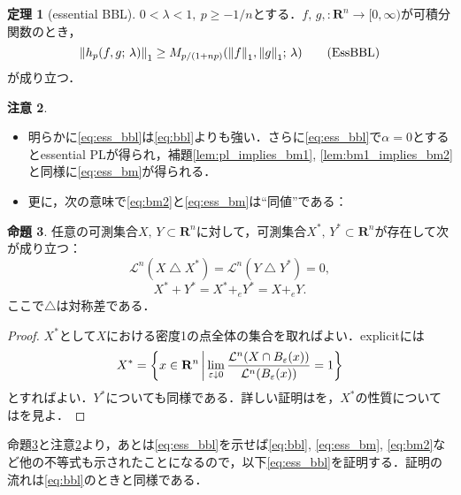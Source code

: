 \documentclass[a4j]{ltjsarticle}
\newcommand{\Rset}{\mathbf{R}}
\newcommand{\Lm}{\mathcal{L}}
\newcommand{\1}{\bm{1}}
\newcommand{\M}[4]{M_{#1}\qty(#2,#3;\,#4)}
\numberwithin{equation}{section}
\theoremstyle{definition}
\newtheorem{thm}{定理}[section]
\newtheorem{prop}[thm]{命題}
\newtheorem{rmk}[thm]{注意}
\begin{document}
\begin{thm}[essential BBL]\label{thm:ess_bbl}
    $0<\lambda<1,\ p\geq -1/n$とする．$f,\,g,\colon\Rset^n\to[0,\infty)$が可積分関数のとき，
    \begin{equation}
        \norm{h_{p}(f,g;\,\lambda)}_{1}\geq \M{p/(1+np)}{\norm{f}_{1}}{\norm{g}_{1}}{\lambda}\label{eq:ess_bbl}\tag{EssBBL}
    \end{equation}
    が成り立つ．
\end{thm}
\begin{rmk}\label{rmk:ess_ineqs}
    \begin{itemize}
        \item 明らかに\eqref{eq:ess_bbl}は\eqref{eq:bbl}よりも強い．さらに\eqref{eq:ess_bbl}で$\alpha=0$とするとessential PLが得られ，補題\ref{lem:pl_implies_bm1}, \ref{lem:bm1_implies_bm2}と同様に\eqref{eq:ess_bm}が得られる．
        \item 更に，次の意味で\eqref{eq:bm2}と\eqref{eq:ess_bm}は``同値''である：
    \end{itemize}
\end{rmk}
\begin{prop}\label{prop:density1}
    任意の可測集合$X,\,Y\subset \Rset^n$に対して，可測集合$X^\ast,\,Y^\ast\subset\Rset^n$が存在して次が成り立つ：
    \begin{equation}
        \Lm^n(X\bigtriangleup X^\ast)=\Lm^n(Y\bigtriangleup Y^\ast)=0,
    \end{equation}
    \begin{equation}
        X^\ast +Y^\ast=X^\ast+_eY^\ast=X+_eY.
    \end{equation}
    ここで$\bigtriangleup$は対称差である．
\end{prop}
\begin{proof}
    $X^\ast$として$X$における密度1の点全体の集合を取ればよい．explicitには
    \begin{equation}
        X^\ast=\qty{x\in\Rset^n\,\middle|\,\lim_{\varepsilon\downarrow0}\frac{\Lm^n(X\cap B_{\varepsilon}(x))}{\Lm^n(B_{\varepsilon}(x))}=1}
    \end{equation}
    とすればよい．$Y^\ast$についても同様である．詳しい証明は\cite{BL}を，$X^\ast$の性質については\cite{EG}を見よ．
\end{proof}
命題\ref{prop:density1}と注意\ref{rmk:ess_ineqs}より，あとは\eqref{eq:ess_bbl}を示せば\eqref{eq:bbl}, \eqref{eq:ess_bm}, \eqref{eq:bm2}など他の不等式も示されたことになるので，以下\eqref{eq:ess_bbl}を証明する．証明の流れは\eqref{eq:bbl}のときと同様である．
\end{document}
